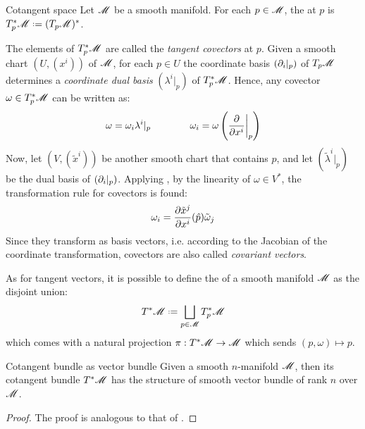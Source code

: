\begin{definition}{Cotangent space}{}
  Let $ \mathscr{M} $ be a smooth manifold. For each $ p \in \mathscr{M} $, the  at $ p $ is $ T^*_p\man \defeq (T_p\man)^* $.
\end{definition}

The elements of $ T^*_p\mathscr{M} $ are called the \emph{tangent covectors} at $ p $. Given a smooth chart $ (U,(x^i)) $ of $ \mathscr{M} $, for each $ p \in U $ the coordinate basis $ (\partial_i \vert_p) $ of $ T_p\mathscr{M} $ determines a \emph{coordinate dual basis} $ (\lambda^i \vert_p) $ of $ T^*_p\mathscr{M} $. Hence, any covector $ \omega \in T^*_p\mathscr{M} $ can be written as:
\begin{equation*}
  \omega = \omega_i \lambda^i \vert_p
  \qquad \qquad
  \omega_i = \omega \left( \frac{\partial}{\partial x^i} \bigg\vert_p \right)
\end{equation*}
Now, let $ (V , (\tilde{x}^i)) $ be another smooth chart that contains $ p $, and let $ (\tilde{\lambda}^i \vert_p) $ be the dual basis of $ (\partial_i \vert_p) $. Applying , by the linearity of $ \omega \in V^* $, the transformation rule for covectors is found:
\begin{equation}
  \omega_i = \frac{\partial \tilde{x}^j}{\partial x^i}(\hat{p}) \tilde{\omega}_j
  \label{eq:covariant-alias}
\end{equation}
Since they transform as basis vectors, i.e. according to the Jacobian of the coordinate transformation, covectors are also called \emph{covariant vectors}.

As for tangent vectors, it is possible to define the  of a smooth manifold $ \mathscr{M} $ as the disjoint union:
\begin{equation}
  T^*\man \defeq \bigsqcup_{p \in \man} T^*_p\man
\end{equation}
which comes with a natural projection $ \pi : T^*\mathscr{M} \rightarrow \mathscr{M} $ which sends $ (p,\omega) \mapsto p $.

\begin{proposition}{Cotangent bundle as vector bundle}{}
  Given a smooth $ n $-manifold $ \mathscr{M} $, then its cotangent bundle $ T^*\mathscr{M} $ has the structure of smooth vector bundle of rank $ n $ over $ \mathscr{M} $.
\end{proposition}

\begin{proofbox}
  \begin{proof}
    The proof is analogous to that of .
  \end{proof}
\end{proofbox}

